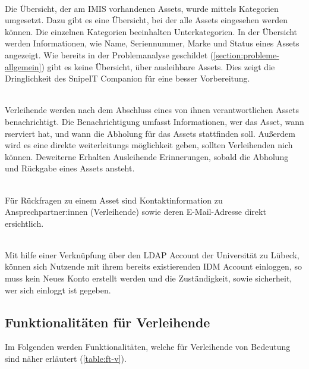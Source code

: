 {\sffamily\color{maincolor}{Ft-VA-1 | Übersicht über ausleihbare Assets }}\\
Die Übersicht, der am IMIS vorhandenen Assets, wurde mittels
Kategorien umgesetzt. Dazu gibt es eine Übersicht, bei der alle Assets
eingesehen werden können. Die einzelnen Kategorien beeinhalten Unterkategorien.
In der Übersicht werden Informationen, wie Name, Seriennummer, Marke und Status
eines Assets angezeigt. Wie bereits in der Problemanalyse geschildet
(\ref{section:probleme-allgemein}) gibt es keine Übersicht, über ausleihbare
Assets. Dies zeigt die Dringlichkeit des SnipeIT Companion für eine besser
Vorbereitung.

{\sffamily\color{maincolor}{Ft-VA-2 | Benachrichtigungen \& Erinnerungen   }}\\
Verleihende werden nach dem Abschluss eines von ihnen verantwortlichen Assets
benachrichtigt. Die Benachrichtigung umfasst Informationen, wer das Asset, wann
rserviert hat, und wann die Abholung für das Assets stattfinden soll. Außerdem
wird es eine direkte weiterleitungs möglichkeit geben, sollten Verleihenden nich
können. Deweiterne Erhalten Ausleihende Erinnerungen, sobald die Abholung und
Rückgabe eines Assets ansteht.

{\sffamily\color{maincolor}{Ft-VA-3 | Sichtbarkeit von Ansprechpartner:innen}}\\
Für Rückfragen zu einem Asset sind Kontaktinformation zu Ansprechpartner:innen
(Verleihende) sowie deren E-Mail-Adresse direkt ersichtlich.

{\sffamily\color{maincolor}{Ft-VA-4 | Authentifizierung per IDM Account}}\\
Mit hilfe einer Verknüpfung über den LDAP Account der Universität zu Lübeck,
können sich Nutzende mit ihrem bereits existierenden IDM Account einloggen, so
muss kein Neues Konto erstellt werden und die Zuständigkeit, sowie sicherheit,
wer sich einloggt ist gegeben.

\subsection{Funktionalitäten für Verleihende}
Im Folgenden werden Funktionalitäten, welche für Verleihende von Bedeutung sind
näher erläutert (\ref{table:ft-v}).

